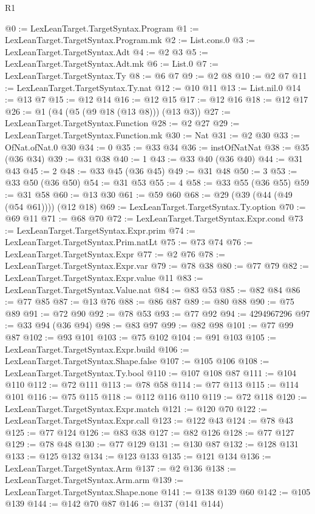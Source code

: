 \begin{lexlean}{R1}
\begin{coremodule}
@0 := LexLeanTarget.TargetSyntax.Program
@1 := LexLeanTarget.TargetSyntax.Program.mk
@2 := List.cons.{0}
@3 := LexLeanTarget.TargetSyntax.Adt
@4 := @2 @3
@5 := LexLeanTarget.TargetSyntax.Adt.mk
@6 := List.{0}
@7 := LexLeanTarget.TargetSyntax.Ty
@8 := @6 @7
@9 := @2 @8
@10 := @2 @7
@11 := LexLeanTarget.TargetSyntax.Ty.nat
@12 := @10 @11
@13 := List.nil.{0}
@14 := @13 @7
@15 := @12 @14
@16 := @12 @15
@17 := @12 @16
@18 := @12 @17
@26 := @1 (@4 (@5 (@9 @18 (@13 @8))) (@13 @3))
@27 := LexLeanTarget.TargetSyntax.Function
@28 := @2 @27
@29 := LexLeanTarget.TargetSyntax.Function.mk
@30 := Nat
@31 := @2 @30
@33 := OfNat.ofNat.{0} @30
@34 := 0
@35 := @33 @34
@36 := instOfNatNat
@38 := @35 (@36 @34)
@39 := @31 @38
@40 := 1
@43 := @33 @40 (@36 @40)
@44 := @31 @43
@45 := 2
@48 := @33 @45 (@36 @45)
@49 := @31 @48
@50 := 3
@53 := @33 @50 (@36 @50)
@54 := @31 @53
@55 := 4
@58 := @33 @55 (@36 @55)
@59 := @31 @58
@60 := @13 @30
@61 := @59 @60
@68 := @29 (@39 (@44 (@49 (@54 @61)))) (@12 @18)
@69 := LexLeanTarget.TargetSyntax.Ty.option
@70 := @69 @11
@71 := @68 @70
@72 := LexLeanTarget.TargetSyntax.Expr.cond
@73 := LexLeanTarget.TargetSyntax.Expr.prim
@74 := LexLeanTarget.TargetSyntax.Prim.natLt
@75 := @73 @74
@76 := LexLeanTarget.TargetSyntax.Expr
@77 := @2 @76
@78 := LexLeanTarget.TargetSyntax.Expr.var
@79 := @78 @38
@80 := @77 @79
@82 := LexLeanTarget.TargetSyntax.Expr.value @11
@83 := LexLeanTarget.TargetSyntax.Value.nat
@84 := @83 @53
@85 := @82 @84
@86 := @77 @85
@87 := @13 @76
@88 := @86 @87
@89 := @80 @88
@90 := @75 @89
@91 := @72 @90
@92 := @78 @53
@93 := @77 @92
@94 := 4294967296
@97 := @33 @94 (@36 @94)
@98 := @83 @97
@99 := @82 @98
@101 := @77 @99 @87
@102 := @93 @101
@103 := @75 @102
@104 := @91 @103
@105 := LexLeanTarget.TargetSyntax.Expr.build
@106 := LexLeanTarget.TargetSyntax.Shape.false
@107 := @105 @106
@108 := LexLeanTarget.TargetSyntax.Ty.bool
@110 := @107 @108 @87
@111 := @104 @110
@112 := @72 @111
@113 := @78 @58
@114 := @77 @113
@115 := @114 @101
@116 := @75 @115
@118 := @112 @116 @110
@119 := @72 @118
@120 := LexLeanTarget.TargetSyntax.Expr.match
@121 := @120 @70
@122 := LexLeanTarget.TargetSyntax.Expr.call
@123 := @122 @43
@124 := @78 @43
@125 := @77 @124
@126 := @83 @38
@127 := @82 @126
@128 := @77 @127
@129 := @78 @48
@130 := @77 @129
@131 := @130 @87
@132 := @128 @131
@133 := @125 @132
@134 := @123 @133
@135 := @121 @134
@136 := LexLeanTarget.TargetSyntax.Arm
@137 := @2 @136
@138 := LexLeanTarget.TargetSyntax.Arm.arm
@139 := LexLeanTarget.TargetSyntax.Shape.none
@141 := @138 @139 @60
@142 := @105 @139
@144 := @142 @70 @87
@146 := @137 (@141 @144)

\end{coremodule}
\end{lexlean}
